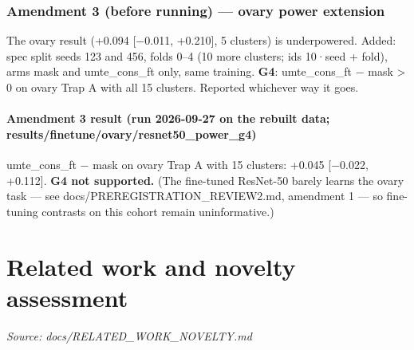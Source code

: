 {\subsubsection{Amendment 3 (before running) --- ovary power extension}\label{amendment-3-before-running--ovary-power-extension}

The ovary result (+0.094 {[}−0.011, +0.210{]}, 5 clusters) is underpowered. Added: spec split seeds 123 and 456, folds 0--4
(10 more clusters; ids 10·seed + fold), arms mask and umte\_cons\_ft only, same training. \textbf{G4}: umte\_cons\_ft − mask \textgreater{} 0
on ovary Trap A with all 15 clusters. Reported whichever way it goes.

\paragraph{Amendment 3 result (run 2026-09-27 on the rebuilt data; results/finetune/ovary/resnet50\_power\_g4)}\label{amendment-3-result-run-2026-09-27-on-the-rebuilt-data-resultsfinetuneovaryresnet50_power_g4}

umte\_cons\_ft − mask on ovary Trap A with 15 clusters: +0.045 {[}−0.022, +0.112{]}. \textbf{G4 not supported.} (The fine-tuned
ResNet-50 barely learns the ovary task --- see docs/PREREGISTRATION\_REVIEW2.md, amendment 1 --- so fine-tuning contrasts on
this cohort remain uninformative.)

}

\section{Related work and novelty assessment}\label{doc:RELATED_WORK_NOVELTY}
\noindent\textit{Source: docs/RELATED\_WORK\_NOVELTY.md}

